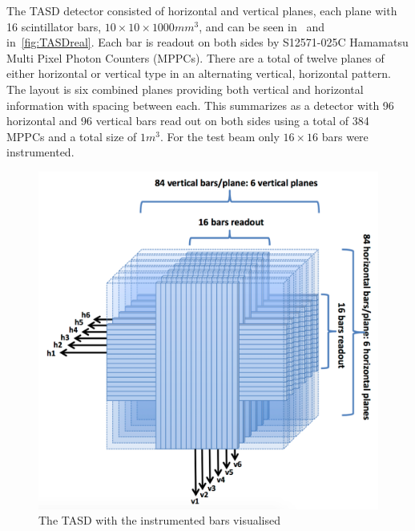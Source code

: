 The TASD detector consisted of horizontal and vertical planes, each plane with 16 scintillator bars, $10\times10\times1000 mm^3$, and can be seen in~ and in~\ref{fig:TASDreal}. Each bar is readout on both sides by S12571-025C Hamamatsu Multi Pixel Photon Counters (MPPCs). There are a total of twelve planes of either horizontal or vertical type in an alternating vertical, horizontal pattern. The layout is six combined planes providing both vertical and horizontal information with spacing between each. This summarizes as a detector with 96 horizontal and 96 vertical bars read out on both sides using a total of 384 MPPCs and a total size of $1m^3$.  For the test beam only $16 \times 16$ bars were instrumented.


\begin{figure}[h!]
\centering
\includegraphics[width=\textwidth]{figures/AIDA.png}
\caption{The TASD with the instrumented bars visualised}
\label{fig:TASD}
\end{figure}

